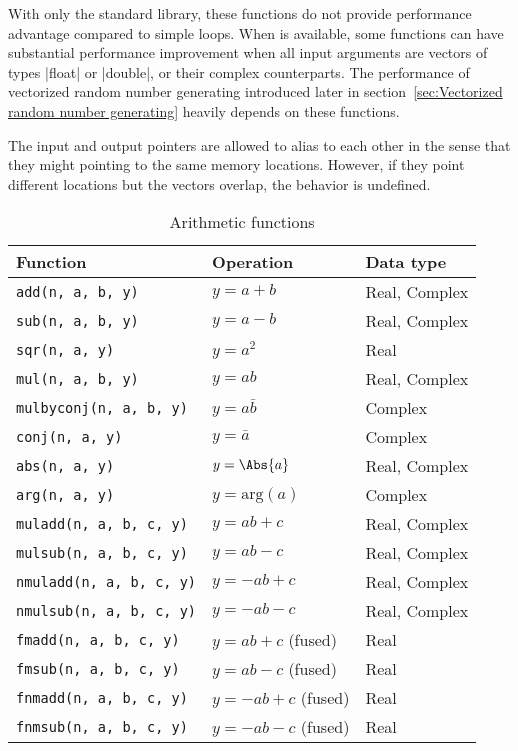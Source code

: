 With only the standard library, these functions do not provide performance
advantage compared to simple loops. When \mkl \vml is available, some functions
can have substantial performance improvement when all input arguments are
vectors of types |float| or |double|, or their complex counterparts. The
performance of vectorized random number generating introduced later in
section~\ref{sec:Vectorized random number generating} heavily depends on these
functions.

The input and output pointers are allowed to alias to each other in the sense
that they might pointing to the same memory locations. However, if they point
different locations but the vectors overlap, the behavior is undefined.

\begin{table}
  \begin{tabularx}{\textwidth}{LLL}
    \toprule
    Function & Operation & Data type \\
    \midrule
    \texttt{add(n, a, b, y)}        & $y = a + b$           & Real, Complex \\
    \texttt{sub(n, a, b, y)}        & $y = a - b$           & Real, Complex \\
    \texttt{sqr(n, a, y)}           & $y = a^2$             & Real          \\
    \texttt{mul(n, a, b, y)}        & $y = ab$              & Real, Complex \\
    \texttt{mulbyconj(n, a, b, y)}  & $y = a\bar{b}$        & Complex       \\
    \texttt{conj(n, a, y)}          & $y = \bar{a}$         & Complex       \\
    \texttt{abs(n, a, y)}           & $y = \Abs{a}$         & Real, Complex \\
    \texttt{arg(n, a, y)}           & $y = \mathrm{arg}(a)$ & Complex       \\
    \texttt{muladd(n, a, b, c, y)}  & $y = ab + c$          & Real, Complex \\
    \texttt{mulsub(n, a, b, c, y)}  & $y = ab - c$          & Real, Complex \\
    \texttt{nmuladd(n, a, b, c, y)} & $y = -ab + c$         & Real, Complex \\
    \texttt{nmulsub(n, a, b, c, y)} & $y = -ab - c$         & Real, Complex \\
    \texttt{fmadd(n, a, b, c, y)}   & $y = ab + c$ (fused)  & Real          \\
    \texttt{fmsub(n, a, b, c, y)}   & $y = ab - c$ (fused)  & Real          \\
    \texttt{fnmadd(n, a, b, c, y)}  & $y = -ab + c$ (fused) & Real          \\
    \texttt{fnmsub(n, a, b, c, y)}  & $y = -ab - c$ (fused) & Real          \\
    \bottomrule
  \end{tabularx}
  \caption{Arithmetic functions}
  \label{tab:Arithmetic functions}
\end{table}

